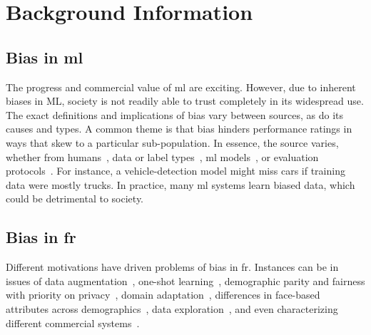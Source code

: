 \section{Background Information}
    \subsection{Bias in \gls{ml}}
        The progress and commercial value of \gls{ml} are exciting. However, due to inherent biases in ML, society is not readily able to trust completely in its widespread use. The exact definitions and implications of bias vary between sources, as do its causes and types. A common theme is that bias hinders performance ratings in ways that skew to a particular sub-population. In essence, the source varies, whether from humans~\cite{windmann1998subconscious}, data or label types~\cite{tommasi2017deeper}, \gls{ml} models~\cite{amini2019uncovering, kim2019learning}, or evaluation protocols~\cite{stock2018convnets}. For instance, a vehicle-detection model might miss cars if training data were mostly trucks. In practice, many \gls{ml} systems learn biased data, which could be detrimental to society. 


    \subsection{Bias in \gls{fr}}
        Different motivations have driven problems of bias in \gls{fr}. Instances can be in issues of data augmentation~\cite{yin2019feature}, one-shot learning~\cite{ding2018one}, demographic parity and fairness with priority on privacy~\cite{huang2018generative}, domain adaptation~\cite{wang2018racial}, differences in face-based attributes across demographics~\cite{wang2018they}, data exploration~\cite{muthukumar2019}, and even characterizing different commercial systems~\cite{buolamwini2018gender}. 
        
